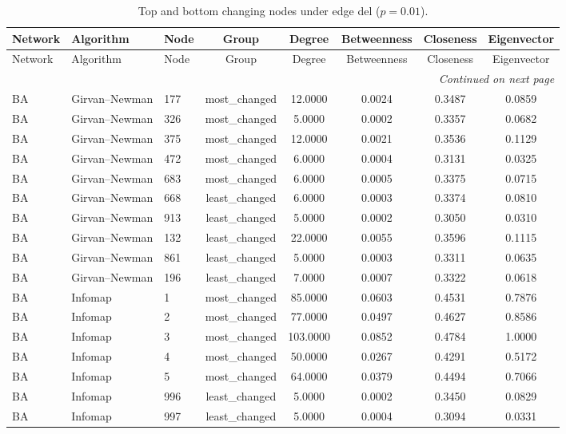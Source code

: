 \begin{longtable}{lllccccc}
\caption{Top and bottom changing nodes under edge del ($p=0.01$).}\label{tab:node_del_p001}\\
\toprule
Network & Algorithm & Node & Group & Degree & Betweenness & Closeness & Eigenvector \\
\midrule
\endfirsthead
\toprule
Network & Algorithm & Node & Group & Degree & Betweenness & Closeness & Eigenvector \\
\midrule
\endhead
\midrule
\multicolumn{8}{r}{\emph{Continued on next page}} \\
\endfoot
\bottomrule
\endlastfoot
BA & Girvan--Newman & 177 & most\_changed & 12.0000 & 0.0024 & 0.3487 & 0.0859 \\
BA & Girvan--Newman & 326 & most\_changed & 5.0000 & 0.0002 & 0.3357 & 0.0682 \\
BA & Girvan--Newman & 375 & most\_changed & 12.0000 & 0.0021 & 0.3536 & 0.1129 \\
BA & Girvan--Newman & 472 & most\_changed & 6.0000 & 0.0004 & 0.3131 & 0.0325 \\
BA & Girvan--Newman & 683 & most\_changed & 6.0000 & 0.0005 & 0.3375 & 0.0715 \\
BA & Girvan--Newman & 668 & least\_changed & 6.0000 & 0.0003 & 0.3374 & 0.0810 \\
BA & Girvan--Newman & 913 & least\_changed & 5.0000 & 0.0002 & 0.3050 & 0.0310 \\
BA & Girvan--Newman & 132 & least\_changed & 22.0000 & 0.0055 & 0.3596 & 0.1115 \\
BA & Girvan--Newman & 861 & least\_changed & 5.0000 & 0.0003 & 0.3311 & 0.0635 \\
BA & Girvan--Newman & 196 & least\_changed & 7.0000 & 0.0007 & 0.3322 & 0.0618 \\
BA & Infomap & 1 & most\_changed & 85.0000 & 0.0603 & 0.4531 & 0.7876 \\
BA & Infomap & 2 & most\_changed & 77.0000 & 0.0497 & 0.4627 & 0.8586 \\
BA & Infomap & 3 & most\_changed & 103.0000 & 0.0852 & 0.4784 & 1.0000 \\
BA & Infomap & 4 & most\_changed & 50.0000 & 0.0267 & 0.4291 & 0.5172 \\
BA & Infomap & 5 & most\_changed & 64.0000 & 0.0379 & 0.4494 & 0.7066 \\
BA & Infomap & 996 & least\_changed & 5.0000 & 0.0002 & 0.3450 & 0.0829 \\
BA & Infomap & 997 & least\_changed & 5.0000 & 0.0004 & 0.3094 & 0.0331 \\

\end{longtable}
